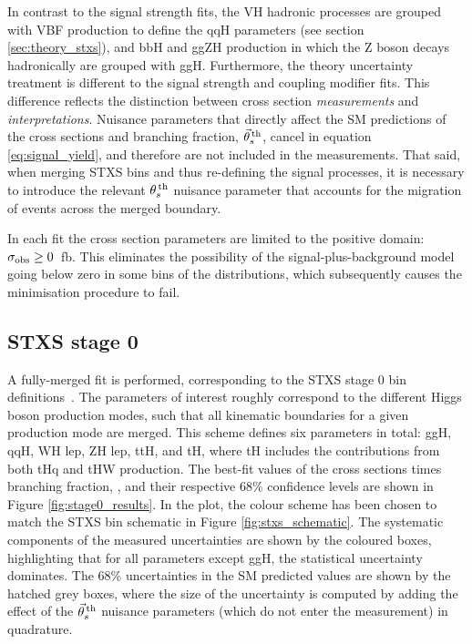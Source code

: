 In contrast to the signal strength fits, the VH hadronic processes are grouped with VBF production to define the qqH parameters (see section \ref{sec:theory_stxs}), and bbH and ggZH production in which the Z boson decays hadronically are grouped with ggH. Furthermore, the theory uncertainty treatment is different to the signal strength and coupling modifier fits. This difference reflects the distinction between cross section \textit{measurements} and \textit{interpretations}. Nuisance parameters that directly affect the SM predictions of the cross sections and branching fraction, $\vec{\theta}^{\,\rm{th}}_{s}$, cancel in equation \ref{eq:signal_yield}, and therefore are not included in the measurements. That said, when merging STXS bins and thus re-defining the signal processes, it is necessary to introduce the relevant $\theta^{\,\rm{th}}_{s}$ nuisance parameter that accounts for the migration of events across the merged boundary. 

In each fit the cross section parameters are limited to the positive domain: $\sigma_{\rm{obs}}\geq0$~fb. This eliminates the possibility of the signal-plus-background model going below zero in some bins of the \mgg distributions, which subsequently causes the minimisation procedure to fail.

\subsection{STXS stage 0}
A fully-merged fit is performed, corresponding to the STXS stage 0 bin definitions~\cite{deFlorian:2016spz}. The parameters of interest roughly correspond to the different Higgs boson production modes, such that all kinematic boundaries for a given production mode are merged. This scheme defines six parameters in total: ggH, qqH, WH lep, ZH lep, ttH, and tH, where tH includes the contributions from both tHq and tHW production. The best-fit values of the cross sections times branching fraction, \xsbr, and their respective 68\% confidence levels are shown in Figure \ref{fig:stage0_results}. In the plot, the colour scheme has been chosen to match the STXS bin schematic in Figure \ref{fig:stxs_schematic}. The systematic components of the measured uncertainties are shown by the coloured boxes, highlighting that for all parameters except ggH, the statistical uncertainty dominates. The 68\% uncertainties in the SM predicted values are shown by the hatched grey boxes, where the size of the uncertainty is computed by adding the effect of the $\vec{\theta}^{\,\rm{th}}_{s}$ nuisance parameters (which do not enter the measurement) in quadrature.

